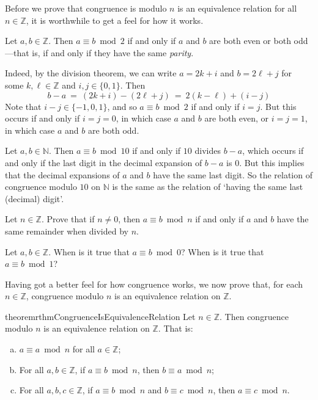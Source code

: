 Before we prove that congruence is modulo $n$ is an equivalence relation for all $n \in \mathbb{Z}$, it is worthwhile to get a feel for how it works.

\begin{example}
\label{exCongruenceModuloTwoIsSameAsParity}
Let $a,b \in \mathbb{Z}$. Then $a \equiv b \bmod 2$ if and only if $a$ and $b$ are both even or both odd---that is, if and only if they have the same \textit{parity}.

Indeed, by the division theorem, we can write $a=2k+i$ and $b=2\ell+j$ for some $k,\ell \in \mathbb{Z}$ and $i,j \in \{ 0,1 \}$. Then
\[ b - a ~=~ (2k+i) - (2\ell+j) ~=~ 2(k-\ell) + (i-j) \]
Note that $i-j \in \{ {-1},0,1 \}$, and so $a \equiv b \bmod 2$ if and only if $i=j$. But this occurs if and only if $i=j=0$, in which case $a$ and $b$ are both even, or $i=j=1$, in which case $a$ and $b$ are both odd.
\end{example}

\begin{example}
\label{exModuloTenIsSameAsLastDigit}
Let $a,b \in \mathbb{N}$. Then $a \equiv b \bmod{10}$ if and only if $10$ divides $b-a$, which occurs if and only if the last digit in the decimal expansion of $b-a$ is $0$. But this implies that the decimal expansions of $a$ and $b$ have the same last digit. So the relation of congruence modulo $10$ on $\mathbb{N}$ is the same as the relation of `having the same last (decimal) digit'.
\end{example}

\begin{exercise}
Let $n \in \mathbb{Z}$. Prove that if $n \ne 0$, then $a \equiv b \bmod n$ if and only if $a$ and $b$ have the same remainder when divided by $n$.
\end{exercise}

\begin{exercise}
Let $a,b \in \mathbb{Z}$. When is it true that $a \equiv b \bmod 0$? When is it true that $a \equiv b \bmod 1$?
\end{exercise}

Having got a better feel for how congruence works, we now prove that, for each $n \in \mathbb{Z}$, congruence modulo $n$ is an equivalence relation on $\mathbb{Z}$.

\begin{restatable}{theorem}{rthmCongruenceIsEquivalenceRelation}
\label{thmCongruenceIsEquivalenceRelation}
Let $n \in \mathbb{Z}$. Then congruence modulo $n$ is an equivalence relation on $\mathbb{Z}$. That is:
\begin{enumerate}[(a)]
\item $a \equiv a \bmod n$ for all $a \in \mathbb{Z}$;
\item For all $a,b \in \mathbb{Z}$, if $a \equiv b \bmod n$, then $b \equiv a \bmod n$;
\item For all $a,b,c \in \mathbb{Z}$, if $a \equiv b \bmod n$ and $b \equiv c \bmod n$, then $a \equiv c \bmod n$.
\end{enumerate}
\end{restatable}

